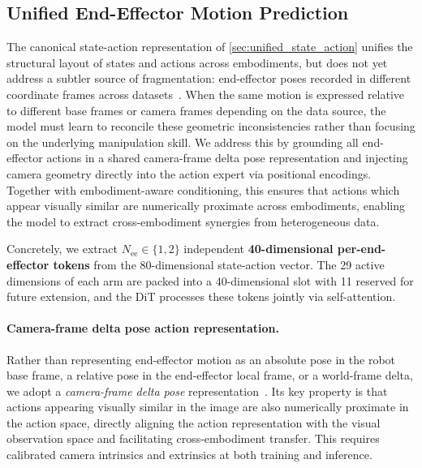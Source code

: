 \subsection{Unified End-Effector Motion Prediction}\label{subsec:cam_delta_action}

The canonical state-action representation of \cref{sec:unified_state_action} unifies the structural layout of states and actions across embodiments, but does not yet address a subtler source of fragmentation: end-effector poses recorded in different coordinate frames across datasets~\citep{lyu2026lda}. When the same motion is expressed relative to different base frames or camera frames depending on the data source, the model must learn to reconcile these geometric inconsistencies rather than focusing on the underlying manipulation skill. We address this by grounding all end-effector actions in a shared camera-frame delta pose representation and injecting camera geometry directly into the action expert via positional encodings. Together with embodiment-aware conditioning, this ensures that actions which appear visually similar are numerically proximate across embodiments, enabling the model to extract cross-embodiment synergies from heterogeneous data.

Concretely, we extract $N_{\mathrm{ee}} \in \{1, 2\}$ independent \textbf{40-dimensional per-end-effector tokens} from the 80-dimensional state-action vector. The 29 active dimensions of each arm are packed into a 40-dimensional slot with 11 reserved for future extension, and the DiT processes these tokens jointly via self-attention.


\paragraph{Camera-frame delta pose action representation.}
Rather than representing end-effector motion as an absolute pose in the robot base frame, a relative pose in the end-effector local frame, or a world-frame delta, we adopt a \emph{camera-frame delta pose} representation~\citep{chen2025toward}. 
Its key property is that actions appearing visually similar in the image are also numerically proximate in the action space, directly aligning the action representation with the visual observation space and facilitating cross-embodiment transfer.
This requires calibrated camera intrinsics and extrinsics at both training and inference.

